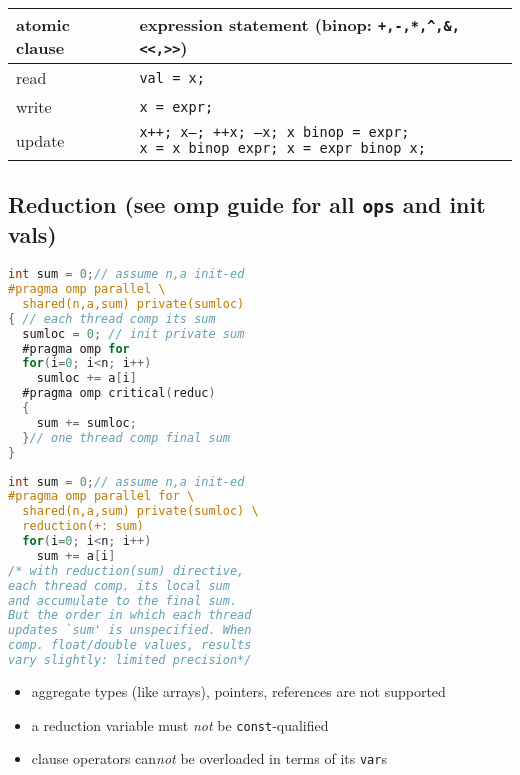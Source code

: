 \begin{tabular}{l|l}
  \hline
  atomic clause & expression statement (binop: \verb|+,-,*,^,&,<<,>>|) \\
  \hline
  read    & \texttt{val = x;}  \\
  write   & \texttt{x = expr;} \\
  update  & \parbox[t]{6.8cm}{\texttt{x++; x--; ++x; --x; x binop = expr;}\\ \texttt{x = x binop expr; x = expr binop x;}}\\
  \hline
  \\
  \hline
\end{tabular}
\subsection*{Reduction (see omp guide for all \texttt{ops} and init vals)}
\begin{minipage}{0.5\linewidth}
\begin{lstlisting}[language=C,xleftmargin=1pt,xrightmargin=3pt]
int sum = 0;// assume n,a init-ed
#pragma omp parallel \
  shared(n,a,sum) private(sumloc)
{ // each thread comp its sum
  sumloc = 0; // init private sum
  #pragma omp for
  for(i=0; i<n; i++)
    sumloc += a[i]
  #pragma omp critical(reduc)
  {
    sum += sumloc;
  }// one thread comp final sum
}
\end{lstlisting}
\end{minipage}
\begin{minipage}{0.5\linewidth}
\begin{lstlisting}[language=C,xleftmargin=3pt]
int sum = 0;// assume n,a init-ed
#pragma omp parallel for \
  shared(n,a,sum) private(sumloc) \
  reduction(+: sum)
  for(i=0; i<n; i++)
    sum += a[i]
/* with reduction(sum) directive,
each thread comp. its local sum
and accumulate to the final sum.
But the order in which each thread
updates `sum' is unspecified. When
comp. float/double values, results
vary slightly: limited precision*/
\end{lstlisting}
\end{minipage}
\begin{itemize}
\item aggregate types (like arrays), pointers, references are not supported
\item a reduction variable must \emph{not} be \texttt{const}-qualified
\item clause operators can\emph{not} be overloaded in terms of its \texttt{var}s
\end{itemize}
